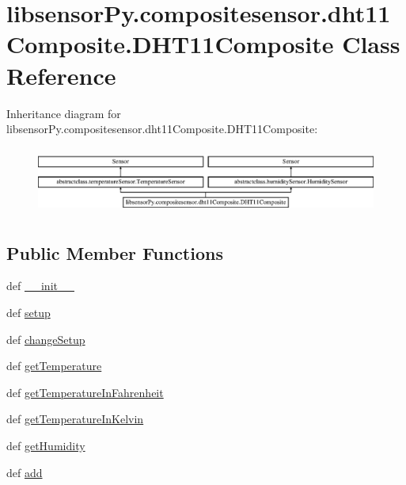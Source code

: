 \hypertarget{classlibsensorPy_1_1compositesensor_1_1dht11Composite_1_1DHT11Composite}{}\section{libsensor\+Py.\+compositesensor.\+dht11\+Composite.\+D\+H\+T11\+Composite Class Reference}
\label{classlibsensorPy_1_1compositesensor_1_1dht11Composite_1_1DHT11Composite}
Inheritance diagram for libsensor\+Py.\+compositesensor.\+dht11\+Composite.\+D\+H\+T11\+Composite\+:\begin{figure}[H]
\begin{center}
\leavevmode
\includegraphics[height=2.222222cm]{classlibsensorPy_1_1compositesensor_1_1dht11Composite_1_1DHT11Composite}
\end{center}
\end{figure}
\subsection*{Public Member Functions}
\begin{DoxyCompactItemize}
\item 
def \hyperlink{classlibsensorPy_1_1compositesensor_1_1dht11Composite_1_1DHT11Composite_abc5e1c44bb5df24f4761e345afa5d6d7}{\+\_\+\+\_\+init\+\_\+\+\_\+}
\item 
def \hyperlink{classlibsensorPy_1_1compositesensor_1_1dht11Composite_1_1DHT11Composite_af51fa33fcbc5c3426886ed1163ec1ac1}{setup}
\item 
def \hyperlink{classlibsensorPy_1_1compositesensor_1_1dht11Composite_1_1DHT11Composite_a455abeba06d698d8dbd24dc1e46e6e39}{change\+Setup}
\item 
def \hyperlink{classlibsensorPy_1_1compositesensor_1_1dht11Composite_1_1DHT11Composite_aef3d8197ae2a421e91172862511dd356}{get\+Temperature}
\item 
def \hyperlink{classlibsensorPy_1_1compositesensor_1_1dht11Composite_1_1DHT11Composite_a6b5fbc0e2271f57e6f6ff0d112d76b6f}{get\+Temperature\+In\+Fahrenheit}
\item 
def \hyperlink{classlibsensorPy_1_1compositesensor_1_1dht11Composite_1_1DHT11Composite_ae3105b1da11fa8c2934e24f982a4703e}{get\+Temperature\+In\+Kelvin}
\item 
def \hyperlink{classlibsensorPy_1_1compositesensor_1_1dht11Composite_1_1DHT11Composite_a05ccaedc39b57cb18fef9fb1c52fceef}{get\+Humidity}
\item 
def \hyperlink{classlibsensorPy_1_1compositesensor_1_1dht11Composite_1_1DHT11Composite_a3a1d6efae5c17dbbd3c48f64cb693466}{add}
\end{DoxyCompactItemize}
